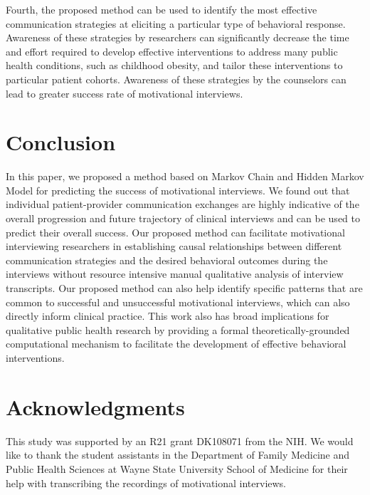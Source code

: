 \documentclass{amia_summit_2018}
\begin{document}
Fourth, the proposed method can be used to identify the most effective communication strategies at eliciting a particular type of behavioral response. Awareness of these strategies by researchers can significantly decrease the time and effort required to develop effective interventions to address many public health conditions, such as childhood obesity, and tailor these interventions to particular patient cohorts. Awareness of these strategies by the counselors can lead to greater success rate of motivational interviews.     
 
\section*{Conclusion}
In this paper, we proposed a method based on Markov Chain and Hidden Markov Model for predicting the success of motivational interviews. We found out that individual patient-provider communication exchanges are highly indicative of the overall progression and future trajectory of clinical interviews and can be used to predict their overall success. Our proposed method can facilitate motivational interviewing researchers in establishing causal relationships between different communication strategies and the desired behavioral outcomes during the  interviews without resource intensive manual qualitative analysis of interview transcripts. Our proposed method can also help identify specific patterns that are common to successful and unsuccessful motivational interviews, which can also directly inform clinical practice. This work also has broad implications for qualitative public health research by providing a formal theoretically-grounded computational mechanism to facilitate the development of effective behavioral interventions.

\section*{Acknowledgments}
This study was supported by an R21 grant DK108071 from the NIH. We would like to thank the student assistants in the Department of Family Medicine and Public Health Sciences at Wayne State University School of Medicine for their help with transcribing the recordings of motivational interviews. 
\pagebreak



\end{document}
